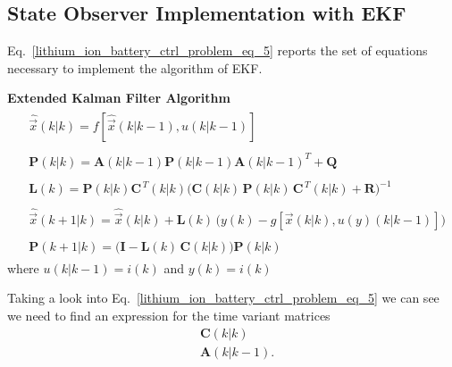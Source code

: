 \documentclass[12pt,a4paper,oneside]{book}
\begin{document}
\begin{onehalfspace}
\subsection{State Observer Implementation with EKF}
Eq.~\eqref{lithium_ion_battery_ctrl_problem_eq_5} reports the set of equations necessary to implement the algorithm of EKF. 
\begin{mybox}
	\noindent\textbf{Extended Kalman Filter Algorithm}
	\begin{align}\label{lithium_ion_battery_ctrl_problem_eq_5}
		\begin{split}
			&\hat{\vec{x}}\left(k|k\right) 
			=f[\hat{\vec{x}}\left(k|k-1\right),{u}\left(k|k-1\right)]
		\end{split} \\[8pt]
		\begin{split}
			&\mathbf{P}\left(k|k\right) = 
			\mathbf{A}(k|k-1)\mathbf{P}\left(k|k-1\right) \mathbf{A}(k|k-1)^T + 
			\mathbf{Q} 
		\end{split}\\[8pt]
		\begin{split}
			&\mathbf{L}(k) = \mathbf{P}(k|k)\mathbf{C}^{\,T}(k|k) 
			\Big(\mathbf{C}(k|k)\,\mathbf{P}(k|k)\,\mathbf{C}^{\,T}(k|k) 
			+\mathbf{R}\Big)^{-1}
		\end{split}\\[8pt]
		\begin{split}
			&\hat{\vec{x}}\left(k+1|k\right) = \hat{\vec{x}}\left(k|k\right) + 
			\mathbf{L}(k)\, \Big({y}(k) - 
			g[\vec{x}(k|k),u(y)\left(k|k-1\right)]\Big)
		\end{split}\\[8pt]
		\begin{split}
			&\mathbf{P}\left(k+1|k\right) = 
			\Big(\mathbf{I}-\mathbf{L}(k)\,\mathbf{C}(k|k) \Big) 
			\mathbf{P}\left(k|k\right) 
		\end{split}
	\end{align}
	where $u(k|k-1)=i(k)$ and $y(k)=i(k)$
\end{mybox} 
Taking a look into Eq.~\eqref{lithium_ion_battery_ctrl_problem_eq_5} we can see we need to find an expression for the time variant matrices
\begin{equation}\label{lithium_ion_battery_ctrl_problem_eq_4a}
	\begin{aligned}
		&\mathbf{C}(k|k) \\[6pt]
		&\mathbf{A}(k|k-1).
	\end{aligned}
\end{equation}


\end{onehalfspace}
\end{document}
